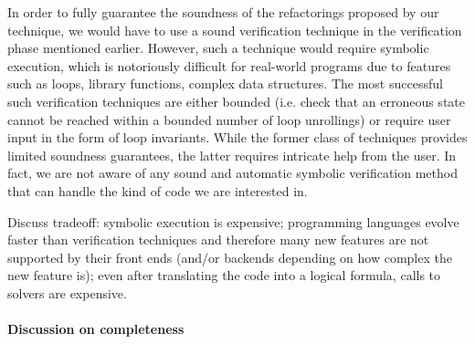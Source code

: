 \documentclass[runningheads,a4paper]{llncs}
\begin{document}
In order to fully guarantee the soundness of the refactorings proposed
by our technique, we would have to use a sound verification technique
in the verification phase mentioned earlier. However, such a technique
would require symbolic execution, which is notoriously difficult for
real-world programs due to features such as loops, library functions,
complex data structures. The most successful such verification
techniques are either bounded (i.e. check that an erroneous state
cannot be reached within a bounded number of loop unrollings) or
require user input in the form of loop invariants. While the former
class of techniques provides limited soundness guarantees, the latter
requires intricate help from the user.  In fact, we are not aware of
any sound and automatic symbolic verification method that can handle
the kind of code we are interested in.

Discuss tradeoff: symbolic execution is expensive; programming
languages evolve faster than verification techniques and therefore
many new features are not supported by their front ends (and/or
backends depending on how complex the new feature is); even after
translating the code into a logical formula, calls to solvers are
expensive.

\paragraph{Discussion on completeness}







\end{document}
